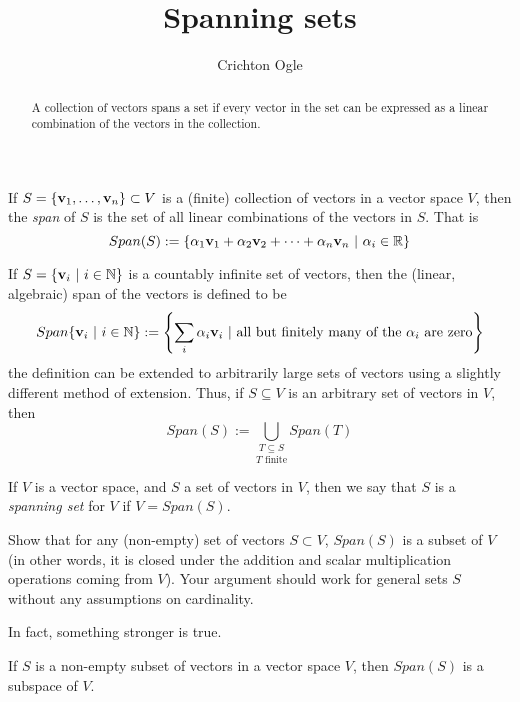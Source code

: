 \documentclass{ximera}
\title{Spanning sets}
\author{Crichton Ogle}
\begin{document}
\begin{abstract}
  A collection of vectors spans a set if every vector in the set can
  be expressed as a linear combination of the vectors in the
  collection.
\end{abstract}
\maketitle

If $S = \{{\bf v}_1,\dots, {\bf v}_n\}\subset V$ is a (finite) collection of vectors in a vector space $V$, then the {\it span} of $S$ is the set of all linear combinations of the vectors in $S$. That is
\[
Span(S) := \{\alpha_1{\bf v}_1 + \alpha_2{\bf v}_2 +\dots +\alpha_n{\bf v}_n\ |\ \alpha_i\in\mathbb R\}
\] 

\begin{remark} If $S = \{{\bf v}_i\ |\ i\in\mathbb N\}$ is a countably infinite set of vectors, then the (linear, algebraic) span of the vectors is defined to be
\[
Span\{{\bf v}_i\ |\ i\in\mathbb N\} := \left\{\sum_i\alpha_i{\bf v}_i\ |\ \text{all but finitely many of the }\alpha_i\text{ are zero}\right\}
\]
the definition can be extended to arbitrarily large sets of vectors using a slightly different method of extension. Thus, if $S\subseteq V$ is an arbitrary set of vectors in $V$, then
\[
Span(S) := \underset{T\text{ finite}}{\underset{T\subseteq S}{\bigcup}} Span(T)
\]
\end{remark}

\begin{definition} If $V$ is a vector space, and $S$ a set of vectors in $V$, then we say that $S$ is a {\it spanning set} for $V$ if $V = Span(S)$.
\end{definition}

\begin{exercise} Show that for any (non-empty) set of vectors $S\subset V$, $Span(S)$ is a subset of $V$ (in other words, it is closed under the addition and scalar multiplication operations coming from $V$). Your argument should work for general sets $S$ without any assumptions on cardinality.
\end{exercise}

In fact, something stronger is true.

\begin{theorem} If $S$ is a non-empty subset of vectors in a vector space $V$, then $Span(S)$ is a subspace of $V$.
\end{theorem}
\end{document}
